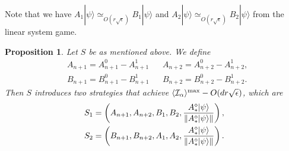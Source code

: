 \documentclass[11pt,letterpaper]{article}
\newcommand{\ket}[1]{|#1\rangle}
\DeclarePairedDelimiter{\norm}{\lVert}{\rVert}
\DeclarePairedDelimiter{\ip}{\langle}{\rangle}
\DeclareMathOperator{\spn}{span}
\DeclareMathOperator{\supp}{supp}
\newcommand{\1}{\mathbb{1}}
\newcommand{\I}{\mathcal{I}}
\newcommand{\se}{\sqrt{\epsilon}}
\newcommand{\appd}[1]{\simeq_{#1}}
\newtheorem{proposition}[theorem]{Proposition}
\theoremstyle{definition}
\begin{document}
Note that we have $A_1 \ket{\psi} \appd{O(r\se)} B_1 \ket{\psi}$ and $A_2 \ket{\psi} \appd{O(r\se)} B_2 \ket{\psi}$ from the linear
system game.


\begin{proposition}
	Let $S$ be as mentioned above. We define
	\begin{align}
		&A_{n+1} = A_{n+1}^0 - A_{n+1}^1 && A_{n+2} = A_{n+2}^0 - A_{n+2}^1,\\
		&B_{n+1} = B_{n+1}^0 - B_{n+1}^1 && B_{n+2} = B_{n+2}^0 - B_{n+2}^1.
	\end{align}
	Then $S$ introduces two strategies that achieve $\ip{\I_\alpha}^{\max} - O(d r\se)$, which are
	\begin{align}
		S_1 = \left(A_{n+1}, A_{n+2}, B_1, B_2, \frac{A_\ast^\diamond\ket{\psi}}{\norm{A_\ast^\diamond\ket{\psi}}}\right),\\
		S_2 = \left(B_{n+1}, B_{n+2}, A_1, A_2, \frac{A_\ast^\diamond\ket{\psi}}{\norm{A_\ast^\diamond\ket{\psi}}}\right).
	\end{align}
\end{proposition}
\end{document}
